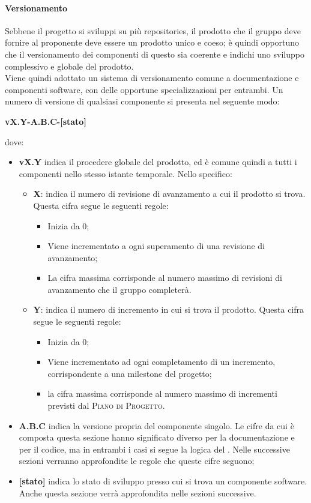 \documentclass[../norme-di-progetto.tex]{subfiles}
\begin{document}
\paragraph{Versionamento}
Sebbene il progetto si sviluppi su più repositories, il prodotto che il gruppo deve fornire al proponente deve essere un prodotto unico e coeso; è quindi opportuno che il versionamento dei componenti di questo sia coerente e indichi uno sviluppo complessivo e globale del prodotto. \\
Viene quindi adottato un sistema di versionamento comune a documentazione e componenti software, con delle opportune specializzazioni per entrambi. Un numero di versione di qualsiasi componente si presenta nel seguente modo:
\begin{center}
  \centering
  \textbf{vX.Y-A.B.C-[stato]}
\end{center} dove:
\begin{itemize}
  \item \textbf{vX.Y} indica il procedere globale del prodotto, ed è comune quindi a tutti i componenti nello stesso istante temporale. Nello specifico:
  \begin{itemize}
    \item \textbf{X}: indica il numero di revisione di avanzamento a cui il prodotto si trova. Questa cifra segue le seguenti regole:
    \begin{itemize}
      \item Inizia da 0;
      \item Viene incrementato a ogni superamento di una revisione di avanzamento;
      \item La cifra massima corrisponde al numero massimo di revisioni di avanzamento che il gruppo completerà.
    \end{itemize}
    \item \textbf{Y}: indica il numero di incremento in cui si trova il prodotto. Questa cifra segue le seguenti regole:
    \begin{itemize}
      \item Inizia da 0;
      \item Viene incrementato ad ogni completamento di un incremento, corrispondente a una milestone del progetto;
      \item la cifra massima corrisponde al numero massimo di incrementi previsti dal \textsc{Piano di Progetto}.
    \end{itemize}
  \end{itemize}
  \item \textbf{A.B.C} indica la versione propria del componente singolo. Le cifre da cui è composta questa sezione hanno significato diverso per la documentazione e per il codice, ma in entrambi i casi si segue la logica del . Nelle successive sezioni verranno approfondite le regole che queste cifre seguono;
  \item \textbf{[stato]} indica lo stato di sviluppo presso cui si trova un componente software. Anche questa sezione verrà approfondita nelle sezioni successive.
\end{itemize}
\end{document}
